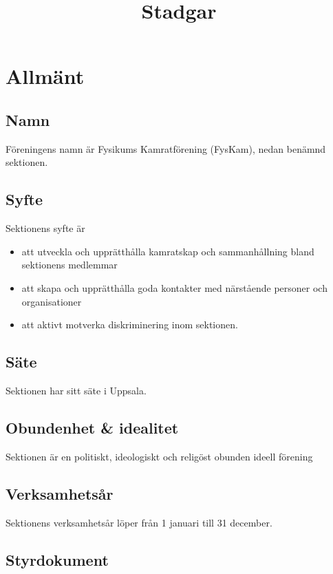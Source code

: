 \documentclass{dgovdoc}
\title{Stadgar}
\begin{document}
\maketitle

\section{Allmänt}

\subsection{Namn}
\label{sec:namn}

Föreningens namn är Fysikums Kamratförening (FysKam), nedan benämnd sektionen.

\subsection{Syfte}

Sektionens syfte är

\begin{itemize}
  \item att utveckla och upprätthålla kamratskap och sammanhållning bland
    sektionens medlemmar
  \item att skapa och upprätthålla goda kontakter med närstående personer och
    organisationer
  \item att aktivt motverka diskriminering inom sektionen.
\end{itemize}

\subsection{Säte}

Sektionen har sitt säte i Uppsala.

\subsection{Obundenhet \& idealitet}

Sektionen är en politiskt, ideologiskt och religöst obunden ideell förening

\subsection{Verksamhetsår}

Sektionens verksamhetsår löper från 1 januari till 31 december.

\subsection{Styrdokument}
\label{sec:styrdokument}
\end{document}
